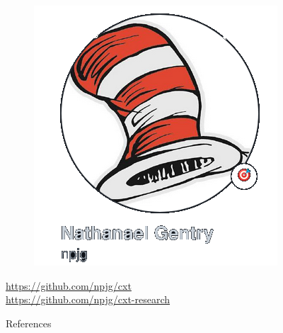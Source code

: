 \documentclass[xcolor={dvipsnames,table},aspectratio=169]{beamer}
\begin{document}
\begin{frame}
  \begin{figure}
    \includegraphics[height=0.5\textheight]{seuss2}
  \end{figure}\pause
  \begin{center}
    \huge \url{https://github.com/npjg/cxt} \\\pause
    \url{https://github.com/npjg/cxt-research}
  \end{center}
\end{frame}

\frame{\titlepage}

\begin{frame}[allowframebreaks]{References}
  
  
\end{frame}
\end{document}
